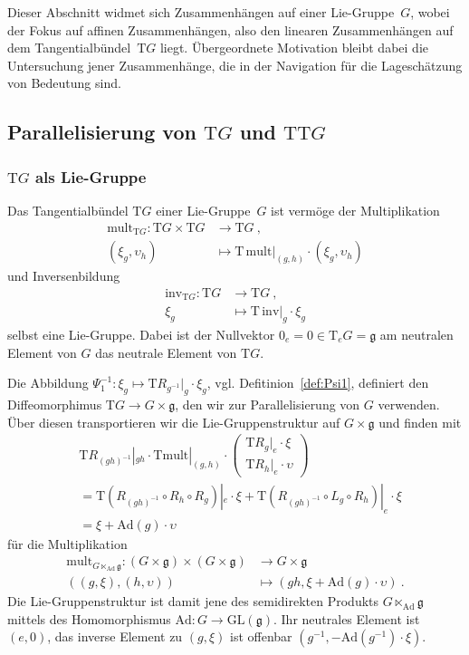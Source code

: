 \documentclass[10pt,a4paper]{article}
\theoremstyle{mytheorem}
\theoremstyle{mydefinition}
\newcommand{\Tt}{\mathrm{T}}
\newcommand{\Ad}{\mathrm{Ad}}
\begin{document}
Dieser Abschnitt widmet sich Zusammenhängen auf einer Lie-Gruppe~$G$, 
wobei der Fokus auf affinen Zusammenhängen, also den linearen Zusammenhängen auf dem Tangentialbündel~$\Tt G$ liegt. 
Übergeordnete Motivation bleibt dabei die Untersuchung jener Zusammenhänge, die in der Navigation für die Lageschätzung von Bedeutung sind.

\subsection{Parallelisierung von $\Tt G$ und $\Tt\Tt G$}

\subsubsection{$\Tt G$ als Lie-Gruppe}

Das Tangentialbündel $\Tt G$ einer Lie-Gruppe~$G$ ist vermöge der Multiplikation
\begin{align}
	\mathrm{mult}_{\Tt G}:
	\Tt G\times\Tt G 
	&\rightarrow \Tt G
	\ ,\nonumber\\
	(\xi_g, \upsilon_h)
	&\mapsto
	\Tt\,\mathrm{mult}|_{(g,h)}
	\cdot
	(\xi_g, \upsilon_h)
\end{align}
und Inversenbildung
\begin{align}
	\mathrm{inv}_{\Tt G}:
	\Tt G
	&\rightarrow \Tt G
	\ ,\nonumber\\
	\xi_g
	&\mapsto
	\Tt\,\mathrm{inv}|_{g}
	\cdot
	\xi_g
\end{align}
selbst eine Lie-Gruppe.
Dabei ist der Nullvektor $0_e=0\in\Tt_eG=\mathfrak{g}$ am neutralen Element von $G$ das neutrale Element von $\Tt G$.

Die Abbildung $\Psi_1^{-1}:\xi_g\mapsto\Tt R_{g^{-1}}|_g\cdot \xi_g$, vgl. Defitinion~\ref{def:Psi1}, definiert den Diffeomorphimus $\Tt G\rightarrow G\times\mathfrak{g}$, den wir zur Parallelisierung von $G$ verwenden.
Über diesen transportieren wir die Lie-Gruppenstruktur auf $G\times\mathfrak{g}$ und finden mit
\begin{align*}
	&\Tt R_{(gh)^{-1}}|_{gh}
	\cdot
	\Tt\mathrm{mult}|_{(g,h)}
	\cdot
	\begin{pmatrix}
		\Tt R_g|_e\cdot \xi \\
		\Tt R_h|_e\cdot \upsilon
	\end{pmatrix}
	\nonumber\\
	&=
	\Tt(R_{(gh)^{-1}}\circ R_h\circ R_g)|_e\cdot\xi
	+
	\Tt(R_{(gh)^{-1}}\circ L_g\circ R_h)|_e\cdot\xi
	\nonumber\\
	&= \xi + \Ad(g)\cdot\upsilon 
\end{align*}
für die Multiplikation
\begin{align}
	\mathrm{mult}_{G\ltimes_{\Ad}\mathfrak{g}}:
	(G\times\mathfrak{g})\times(G\times\mathfrak{g})
	&\rightarrow G\times\mathfrak{g}
	\nonumber\\
	((g,\xi), (h,\upsilon))
	&\mapsto
	(gh, \xi + \Ad(g)\cdot\upsilon)
	\ .
\end{align}
Die Lie-Gruppenstruktur ist damit jene des semidirekten Produkts
$G\ltimes_{\Ad}\mathfrak{g}$ mittels des Homomorphismus $\Ad:G\rightarrow\mathrm{GL}(\mathfrak{g})$.
Ihr neutrales Element ist $(e,0)$, 
das inverse Element zu $(g,\xi)$ ist offenbar $(g^{-1},-\Ad(g^{-1})\cdot\xi)$.
\end{document}
